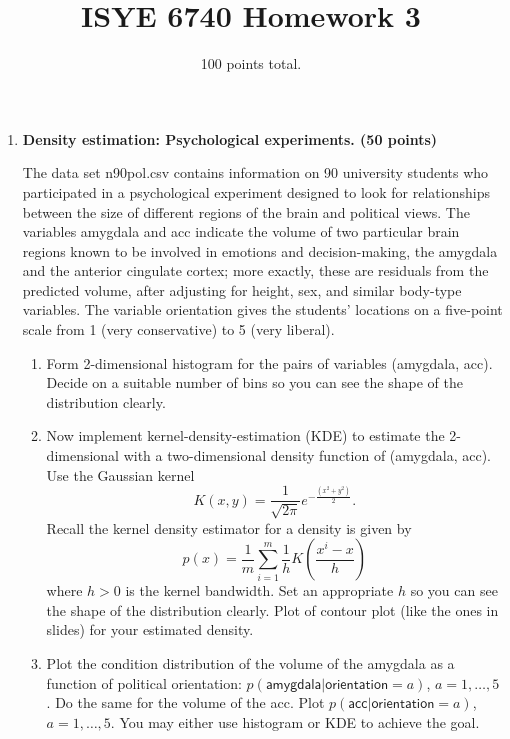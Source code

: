 \documentclass[twoside,10pt]{article}
\begin{document}
\title{ISYE 6740 Homework 3}
\date{100 points total.}
\maketitle




\begin{enumerate}


\item {\bf Density estimation: Psychological experiments. (50 points)}

 The data set \textsf{n90pol.csv} contains information on 90 university students who participated in a psychological experiment designed to look for relationships between the size of different regions of the brain and political views. The variables \textsf{amygdala} and \textsf{acc} indicate the volume of two particular brain regions known to be involved in emotions and decision-making, the amygdala and the anterior cingulate cortex; more exactly, these are residuals from the predicted volume, after adjusting for height, sex, and similar body-type variables. The variable \textsf{orientation} gives the students' locations on a five-point scale from 1 (very conservative) to 5 (very liberal). %
 
 \begin{enumerate}
 \item Form 2-dimensional histogram for the pairs of variables (\textsf{amygdala}, \textsf{acc}). Decide on a suitable number of bins so you can see the shape of the distribution clearly. 
 
 \item Now implement kernel-density-estimation (KDE) to estimate the 2-dimensional with a two-dimensional density function of (\textsf{amygdala}, \textsf{acc}). Use the Gaussian kernel \[K(x, y) = \frac{1}{\sqrt {2\pi}} e^{-\frac{(x^2 + y^2)}{2}}.\] Recall the kernel density estimator for a density is given by
 \[
 p(x) = \frac 1 m \sum_{i=1}^m \frac 1 h
 K\left(
 \frac{x^i - x}{h}
 \right)
 \]
 where $h >0$ is the kernel bandwidth. Set an appropriate $h$ so you can see the shape of the distribution clearly. Plot of contour plot (like the ones in slides) for your estimated density. 
 \item Plot the condition distribution of the volume of the \textsf{amygdala} as a function of political \textsf{orientation}: $p(\textsf{amygdala}|\textsf{orientation}=a)$, $a = 1, \ldots, 5$. Do the same for the volume of the 
 \textsf{acc}. Plot $p(\textsf{acc}|\textsf{orientation}=a)$, $a = 1, \ldots, 5$. You may either use histogram or KDE to achieve the goal.
 \end{enumerate}




\end{enumerate}
\end{document}
